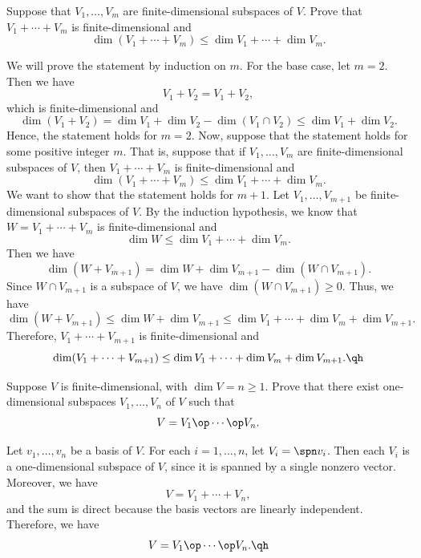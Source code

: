 \begin{exercise}[2c17]
    Suppose that $V_1, \ldots, V_m$ are finite-dimensional subspaces of $V$. Prove that $V_1 + \cdots + V_m$ is finite-dimensional and
    \[\dim(V_1 + \cdots + V_m) \leq \dim V_1 + \cdots + \dim V_m.\]
\end{exercise}

\begin{sol}
    We will prove the statement by induction on $m$. For the base case, let $m = 2$. Then we have
    \[V_1 + V_2 = V_1 + V_2,\]
    which is finite-dimensional and
    \[\dim(V_1 + V_2) = \dim V_1 + \dim V_2 - \dim(V_1 \cap V_2) \leq \dim V_1 + \dim V_2.\]
    Hence, the statement holds for $m = 2$. Now, suppose that the statement holds for some positive integer $m$. That is, suppose that if $V_1, \ldots, V_m$ are finite-dimensional subspaces of $V$, then $V_1 + \cdots + V_m$ is finite-dimensional and
    \[\dim(V_1 + \cdots + V_m) \leq \dim V_1 + \cdots + \dim V_m.\]
    We want to show that the statement holds for $m + 1$. Let $V_1, \ldots, V_{m + 1}$ be finite-dimensional subspaces of $V$. By the induction hypothesis, we know that $W = V_1 + \cdots + V_m$ is finite-dimensional and
    \[\dim W \leq \dim V_1 + \cdots + \dim V_m.\]
    Then we have
    \[\dim(W + V_{m + 1}) = \dim W + \dim V_{m + 1} - \dim(W \cap V_{m + 1}).\]
    Since $W \cap V_{m + 1}$ is a subspace of $V$, we have $\dim(W \cap V_{m + 1}) \geq 0$. Thus, we have
    \[\dim(W + V_{m + 1}) \leq \dim W + \dim V_{m + 1} \leq \dim V_1 + \cdots + \dim V_m + \dim V_{m + 1}.\]
    Therefore, $V_1 + \cdots + V_{m + 1}$ is finite-dimensional and
    \[\dim(V_1 + \cdots + V_{m + 1}) \leq \dim V_1 + \cdots + \dim V_m + \dim V_{m + 1}. \qh\]
\end{sol}

\begin{exercise}[2c18]
    Suppose $V$ is finite-dimensional, with $\dim V = n \geq 1$. Prove that there exist one-dimensional subspaces $V_1, \ldots, V_n$ of $V$ such that
    \[V = V_1 \op \cdots \op V_n.\]
\end{exercise}

\begin{sol}
    Let $v_1, \ldots, v_n$ be a basis of $V$. For each $i = 1, \ldots, n$, let $V_i = \spn v_i$. Then each $V_i$ is a one-dimensional subspace of $V$, since it is spanned by a single nonzero vector. Moreover, we have
    \[V = V_1 + \cdots + V_n,\]
    and the sum is direct because the basis vectors are linearly independent. Therefore, we have
    \[V = V_1 \op \cdots \op V_n. \qh\]
\end{sol}

